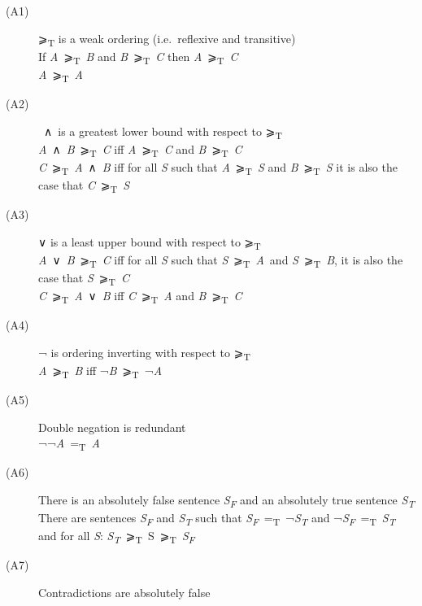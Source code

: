\documentclass[
  11pt,
  letterpaper,
  DIV=11,
  numbers=noendperiod,
  twoside]{scrartcl}
\begin{document}
\begin{description}
\item[(A1)]
⩾\textsubscript{T} is a weak ordering (i.e.~reflexive and transitive)\\
If \emph{A}~⩾\textsubscript{T}~\emph{B} and
\emph{B}~⩾\textsubscript{T}~\emph{C} then
\emph{A}~⩾\textsubscript{T}~\emph{C}\\
\emph{A}~⩾\textsubscript{T}~\emph{A}
\item[(A2)]
~∧~is a greatest lower bound with respect to ⩾\textsubscript{T}\\
\emph{A}~∧~\emph{B}~⩾\textsubscript{T}~\emph{C} iff
\emph{A}~⩾\textsubscript{T}~\emph{C} and
\emph{B}~⩾\textsubscript{T}~\emph{C}\\
\emph{C}~⩾\textsubscript{T}~\emph{A}~∧~\emph{B} iff for all \emph{S}
such that \emph{A}~⩾\textsubscript{T}~\emph{S} and
\emph{B}~⩾\textsubscript{T}~\emph{S} it is also the case that
\emph{C}~⩾\textsubscript{T}~\emph{S}
\item[(A3)]
∨ is a least upper bound with respect to ⩾\textsubscript{T}\\
\emph{A}~∨~\emph{B}~⩾\textsubscript{T}~\emph{C} iff for all \emph{S}
such that \emph{S}~⩾\textsubscript{T}~\emph{A}~and
\emph{S}~⩾\textsubscript{T}~\emph{B}, it is also the case that
\emph{S}~⩾\textsubscript{T}~\emph{C}\\
\emph{C}~⩾\textsubscript{T}~\emph{A}~∨~\emph{B} iff
\emph{C}~⩾\textsubscript{T}~\emph{A} and
\emph{B}~⩾\textsubscript{T}~\emph{C}
\item[(A4)]
¬ is ordering inverting with respect to ⩾\textsubscript{T}\\
\emph{A}~⩾\textsubscript{T}~\emph{B} iff
¬\emph{B}~⩾\textsubscript{T}~¬\emph{A}
\item[(A5)]
Double negation is redundant\\
¬¬\emph{A}~=\textsubscript{T}~\emph{A}
\item[(A6)]
There is an absolutely false sentence \emph{S\textsubscript{F}} and an
absolutely true sentence \emph{S\textsubscript{T}}\\
There are sentences \emph{S\textsubscript{F}} and
\emph{S\textsubscript{T}} such that
\emph{S\textsubscript{F}}~=\textsubscript{T}~¬\emph{S\textsubscript{T}}
and
¬\emph{S\textsubscript{F}}~=\textsubscript{T}~\emph{S\textsubscript{T}}
and for all \emph{S}:
\emph{S\textsubscript{T}}~⩾\textsubscript{T}~S~⩾\textsubscript{T}~\emph{S\textsubscript{F}}
\item[(A7)]
Contradictions are absolutely false\\

\end{description}
\end{document}
